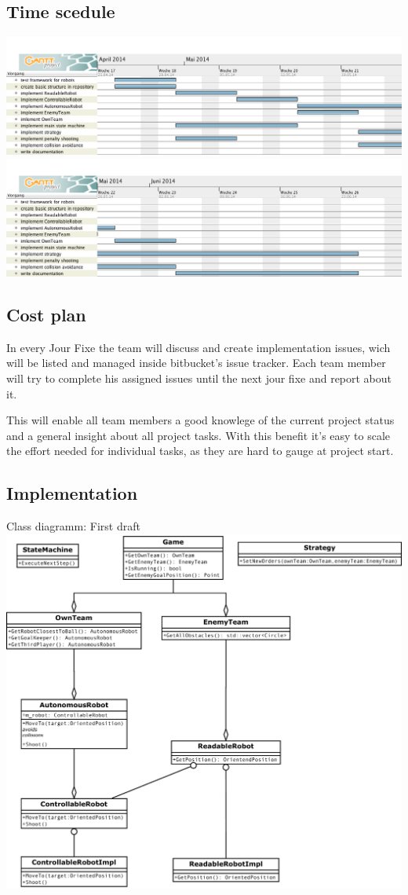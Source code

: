 \documentclass[12pt]{article}
\begin{document}
\subsection{Time scedule}
\includegraphics[width=\textwidth]{../ganttchart1.png}
\includegraphics[width=\textwidth]{../ganttchart2.png}

\subsection{Cost plan}
In every Jour Fixe the team will discuss and create implementation issues, wich will be listed and managed inside bitbucket's issue tracker. 
Each team member will try to complete his assigned issues until the next jour fixe and report about it.

This will enable all team members a good knowlege of the current project status and a general insight about all project tasks. With this benefit it's easy to scale the effort needed for individual tasks, as they are hard to gauge at project start.

\subsection{Implementation}
Class diagramm: First draft\\
\includegraphics[width=\textwidth]{../architecture.pdf}
\end{document}

